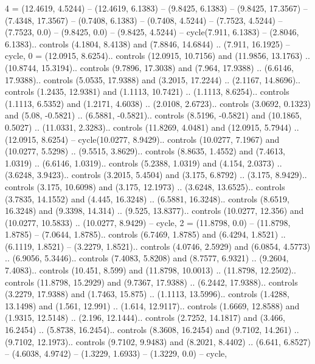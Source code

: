 {4} = {(12.4619, 4.5244) -- (12.4619, 6.1383) -- (9.8425, 6.1383) -- (9.8425, 17.3567) -- (7.4348, 17.3567) -- (0.7408, 6.1383) -- (0.7408, 4.5244) -- (7.7523, 4.5244) -- (7.7523, 0.0) -- (9.8425, 0.0) -- (9.8425, 4.5244) -- cycle(7.911, 6.1383) -- (2.8046, 6.1383).. controls (4.1804, 8.4138) and (7.8846, 14.6844) .. (7.911, 16.1925) -- cycle},
{0} = {(12.0915, 8.6254).. controls (12.0915, 10.7156) and (11.9856, 13.1763) .. (10.8744, 15.3194).. controls (9.7896, 17.3038) and (7.964, 17.9388) .. (6.6146, 17.9388).. controls (5.0535, 17.9388) and (3.2015, 17.2244) .. (2.1167, 14.8696).. controls (1.2435, 12.9381) and (1.1113, 10.7421) .. (1.1113, 8.6254).. controls (1.1113, 6.5352) and (1.2171, 4.6038) .. (2.0108, 2.6723).. controls (3.0692, 0.1323) and (5.08, -0.5821) .. (6.5881, -0.5821).. controls (8.5196, -0.5821) and (10.1865, 0.5027) .. (11.0331, 2.3283).. controls (11.8269, 4.0481) and (12.0915, 5.7944) .. (12.0915, 8.6254) -- cycle(10.0277, 8.9429).. controls (10.0277, 7.1967) and (10.0277, 5.5298) .. (9.5515, 3.8629).. controls (8.8635, 1.4552) and (7.4613, 1.0319) .. (6.6146, 1.0319).. controls (5.2388, 1.0319) and (4.154, 2.0373) .. (3.6248, 3.9423).. controls (3.2015, 5.4504) and (3.175, 6.8792) .. (3.175, 8.9429).. controls (3.175, 10.6098) and (3.175, 12.1973) .. (3.6248, 13.6525).. controls (3.7835, 14.1552) and (4.445, 16.3248) .. (6.5881, 16.3248).. controls (8.6519, 16.3248) and (9.3398, 14.314) .. (9.525, 13.8377).. controls (10.0277, 12.356) and (10.0277, 10.5833) .. (10.0277, 8.9429) -- cycle},
{2} = {(11.8798, 0.0) -- (11.8798, 1.8785) -- (7.0644, 1.8785).. controls (6.7469, 1.8785) and (6.4294, 1.8521) .. (6.1119, 1.8521) -- (3.2279, 1.8521).. controls (4.0746, 2.5929) and (6.0854, 4.5773) .. (6.9056, 5.3446).. controls (7.4083, 5.8208) and (8.7577, 6.9321) .. (9.2604, 7.4083).. controls (10.451, 8.599) and (11.8798, 10.0013) .. (11.8798, 12.2502).. controls (11.8798, 15.2929) and (9.7367, 17.9388) .. (6.2442, 17.9388).. controls (3.2279, 17.9388) and (1.7463, 15.875) .. (1.1113, 13.5996).. controls (1.4288, 13.1498) and (1.561, 12.991) .. (1.614, 12.9117).. controls (1.6669, 12.8588) and (1.9315, 12.5148) .. (2.196, 12.1444).. controls (2.7252, 14.1817) and (3.466, 16.2454) .. (5.8738, 16.2454).. controls (8.3608, 16.2454) and (9.7102, 14.261) .. (9.7102, 12.1973).. controls (9.7102, 9.9483) and (8.2021, 8.4402) .. (6.641, 6.8527) -- (4.6038, 4.9742) -- (1.3229, 1.6933) -- (1.3229, 0.0) -- cycle},

